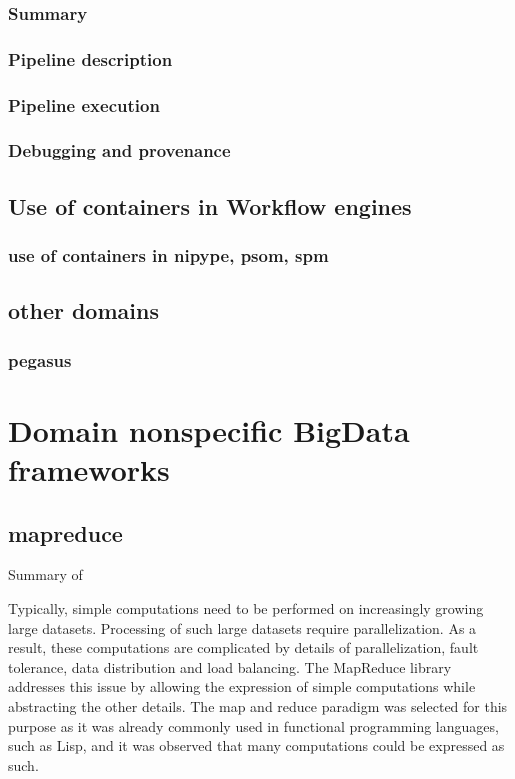 \documentclass{report}
\begin{document}
        \subsection{Summary}
        \subsection{Pipeline description}
        \subsection{Pipeline execution}
        \subsection{Debugging and provenance} 
    \section{Use of containers in Workflow engines} 
        \subsection{use of containers in nipype, psom, spm}
        
       \section{other domains}
       	\subsection{pegasus}
		
\chapter{Domain nonspecific BigData frameworks} 
    \section{mapreduce}
        Summary of ~\cite{mapred}

        Typically, simple computations need to be performed on 
        increasingly growing large datasets. Processing of such 
        large datasets require parallelization. As a result, 
        these computations are complicated by details of 
        parallelization, fault tolerance, data distribution and 
        load balancing. The MapReduce library addresses this issue 
        by allowing the expression of simple computations while 
        abstracting the other details. The map and reduce paradigm 
        was selected for this purpose as it was already commonly 
        used in functional programming languages, such as Lisp, and 
        it was observed that many computations could be expressed 
        as such.
\end{document}
